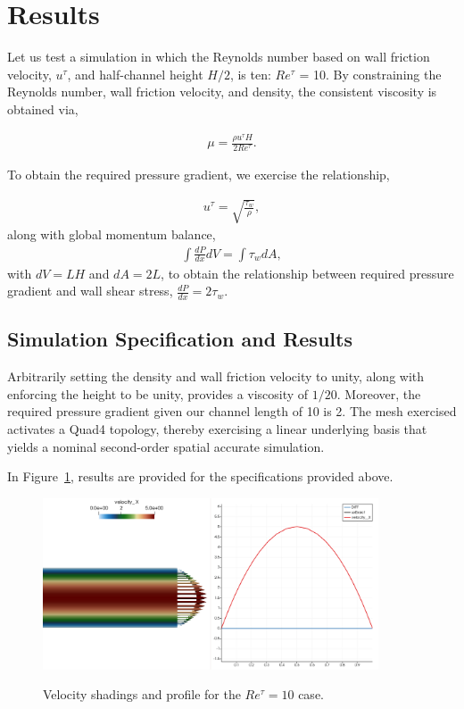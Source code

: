 \documentclass{article}
\begin{document}
\section{Results}
Let us test a simulation in which the Reynolds number based on wall friction
velocity, $u^\tau$, and half-channel height $H/2$, is ten: $Re^\tau$ = 10.
By constraining the Reynolds number, wall friction velocity, and density, 
the consistent viscosity is obtained via,

\begin{align}
  \mu = \frac{\rho u^\tau H}{2 Re^\tau}.
\label{eq:muForm}
\end{align}

To obtain the required pressure gradient, we exercise the relationship,

\begin{align}
  u^\tau = \sqrt{\frac{\tau_w}{\rho}},
\label{eq:tauWall}
\end{align}
along with global momentum balance,
%
\begin{align}
\int \frac{dP}{dx} dV = \int \tau_w dA,
\label{eq:balance}
\end{align}
with $dV = LH$ and $dA = 2L$, to obtain the relationship between
required pressure gradient and wall shear stress, $\frac{dP}{dx} = 2\tau_w$.

\subsection{Simulation Specification and Results}

Arbitrarily setting the density and wall friction velocity to unity, 
along with enforcing the height to be unity, provides a viscosity of $1/20$.
Moreover, the required pressure gradient given our channel length of 10 is
2. The mesh exercised activates a Quad4 topology, thereby exercising a
linear underlying basis that yields a nominal second-order spatial accurate
simulation.

In Figure~\ref{fig:results}, results are provided for the specifications
provided above.

\begin{figure}[!htbp]
  \centering
  {
   \includegraphics[height=2.0in]{images/2d_quad4_channel_results.png}
  }
  \caption{Velocity shadings and profile for the $Re^\tau = 10$ case.}
  \label{fig:results}
\end{figure}
\end{document}
